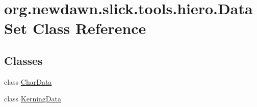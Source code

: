 \hypertarget{classorg_1_1newdawn_1_1slick_1_1tools_1_1hiero_1_1_data_set}{}\section{org.\+newdawn.\+slick.\+tools.\+hiero.\+Data\+Set Class Reference}
\label{classorg_1_1newdawn_1_1slick_1_1tools_1_1hiero_1_1_data_set}
\subsection*{Classes}
\begin{DoxyCompactItemize}
\item 
class \mbox{\hyperlink{classorg_1_1newdawn_1_1slick_1_1tools_1_1hiero_1_1_data_set_1_1_char_data}{Char\+Data}}
\item 
class \mbox{\hyperlink{classorg_1_1newdawn_1_1slick_1_1tools_1_1hiero_1_1_data_set_1_1_kerning_data}{Kerning\+Data}}
\end{DoxyCompactItemize}
